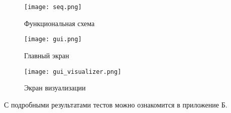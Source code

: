 \par\vspace{1em}
\begin{figure}[H]
    \centering
    \texttt{[image: seq.png]}
    \caption{Функциональная схема}
\end{figure}
\par\vspace{1em}
\begin{figure}[H]
    \centering
    \texttt{[image: gui.png]}
    \caption{Главный экран}
\end{figure}
\par\vspace{1em}
\begin{figure}[H]
    \centering
    \texttt{[image: gui\_visualizer.png]}
    \caption{Экран визуализации}
\end{figure}

С подробными результатами тестов можно ознакомится в приложение Б.